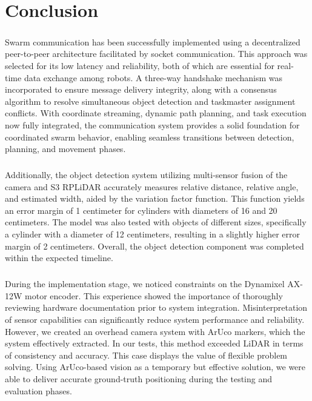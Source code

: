 \chapter{Conclusion}

\paragraph*{}
Swarm communication has been successfully implemented using a decentralized peer-to-peer architecture facilitated by socket communication. This approach was selected for its low latency and reliability, both of which are essential for real-time data exchange among robots. A three-way handshake mechanism was incorporated to ensure message delivery integrity, along with a consensus algorithm to resolve simultaneous object detection and taskmaster assignment conflicts. With coordinate streaming, dynamic path planning, and task execution now fully integrated, the communication system provides a solid foundation for coordinated swarm behavior, enabling seamless transitions between detection, planning, and movement phases.

\paragraph*{}
Additionally, the object detection system utilizing multi-sensor fusion of the camera and S3 RPLiDAR accurately measures relative distance, relative angle, and estimated width, aided by the variation factor function. This function yields an error margin of 1 centimeter for cylinders with diameters of 16 and 20 centimeters. The model was also tested with objects of different sizes, specifically a cylinder with a diameter of 12 centimeters, resulting in a slightly higher error margin of 2 centimeters. Overall, the object detection component was completed within the expected timeline.

\paragraph*{}
During the implementation stage, we noticed constraints on the Dynamixel AX-12W motor encoder. This experience showed the importance of thoroughly reviewing hardware documentation prior to system integration. Misinterpretation of sensor capabilities can significantly reduce system performance and reliability. However, we created an overhead camera system with ArUco markers, which the system effectively extracted. In our tests, this method exceeded LiDAR in terms of consistency and accuracy. This case displays the value of flexible problem solving. Using ArUco-based vision as a temporary but effective solution, we were able to deliver accurate ground-truth positioning during the testing and evaluation phases.
